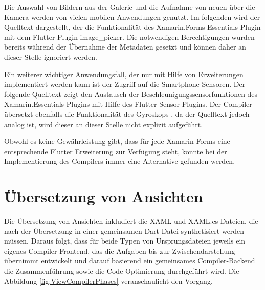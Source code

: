 Die Auswahl von Bildern aus der Galerie und die Aufnahme von neuen über die Kamera werden von vielen mobilen Anwendungen genutzt.  Im folgenden wird der Quelltext dargestellt, der die Funktionalität des Xamarin.Forms Essentials Plugin mit dem Flutter Plugin \glq image\_picker\grq .  Die notwendigen Berechtigungen wurden bereits während der Übernahme der Metadaten gesetzt und können daher an dieser Stelle ignoriert werden.



Ein weiterer wichtiger Anwendungsfall,  der nur mit Hilfe von Erweiterungen implementiert werden kann ist der Zugriff auf die Smartphone Sensoren.  Der folgende Quelltext zeigt den Austausch der Beschleunigungssensorfunktionen des Xamarin.Essentials Plugins mit Hilfe des Flutter Sensor Plugins.  Der Compiler übersetzt ebenfalls die Funktionalität des Gyroskops , da der Quelltext jedoch analog ist, wird dieser an dieser Stelle nicht explizit aufgeführt. 



 
 
Obwohl es keine Gewährleistung gibt, dass für jede Xamarin Forms eine entsprechende Flutter 
Erweiterung zur Verfügung steht, konnte bei der Implementierung des Compilers immer eine  Alternative gefunden werden.


\section{Übersetzung von Ansichten}
Die Übersetzung von Ansichten inkludiert die XAML und XAML.cs Dateien, die nach der Übersetzung in einer gemeinsamen Dart-Datei synthetisiert werden müssen.  Daraus folgt,  dass für beide Typen von Ursprungsdateien jeweils ein eigenes Compiler Frontend,  das die Aufgaben bis zur Zwischendarstellung übernimmt entwickelt und darauf basierend ein gemeinsames Compiler-Backend die Zusammenführung sowie die Code-Optimierung durchgeführt wird.  Die Abbildung  \ref{fig:ViewCompilerPhases} veranschaulicht den Vorgang. 

